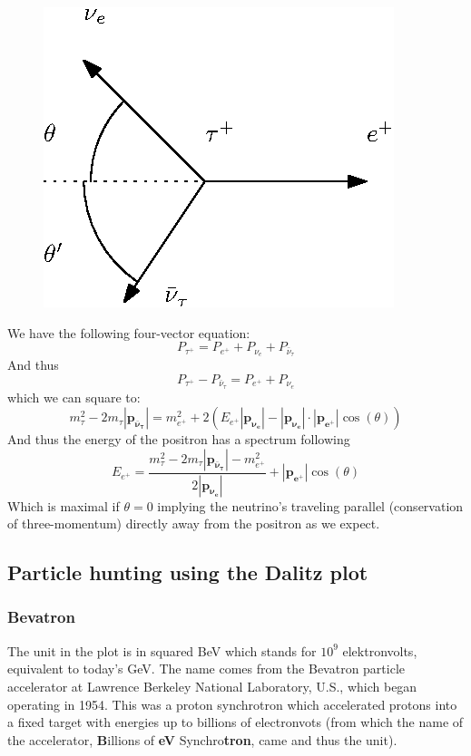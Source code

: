 \documentclass[10pt,a4paper,twoside]{article}
\begin{document}
\begin{figure}[H]
	\centering
	\includegraphics{interaction.eps}
\end{figure}
\noindent
We have the following four-vector equation:
\begin{equation}
	P_{\tau^+} = P_{e^+} + P_{\nu_e} + P_{\bar{\nu}_{\tau}}
\end{equation}
And thus
\begin{equation}
P_{\tau^+} - P_{\bar{\nu}_{\tau}}= P_{e^+} + P_{\nu_e}
\end{equation}
which we can square to:
\begin{equation}
	m_{\tau}^2 - 2m_{\tau}|\boldsymbol{p_{\bar{\nu}_{\tau}}}| = m_{e^+}^2+2\left(E_{e^+}|\boldsymbol{p_{\nu_{e}}}| - |\boldsymbol{p_{\nu_{e}}}|\cdot|\boldsymbol{p_{e^+}}|\cos(\theta)\right)
\end{equation}
And thus the energy of the positron has a spectrum following
\begin{equation}
	E_{e^+} = \frac{m_{\tau}^2 - 2m_{\tau}|\boldsymbol{p_{\bar{\nu}_{\tau}}}| - m_{e^+}^2}{2|\boldsymbol{p_{\nu_{e}}}|} + |\boldsymbol{p_{e^+}}|\cos(\theta)
\end{equation}
Which is maximal if $\theta = 0$ implying the neutrino's traveling parallel (conservation of three-momentum) directly away from the positron as we expect.
\subsection{Particle hunting using the Dalitz plot}
\subsubsection*{Bevatron}
The unit in the plot is in squared BeV which stands for $10^9$ elektronvolts, equivalent to today's GeV. The name comes from the Bevatron particle accelerator at Lawrence Berkeley National Laboratory, U.S., which began operating in 1954\cite{Lawrence}. This was a proton synchrotron which accelerated protons into a fixed target with energies up to billions of electronvots (from which the name of the accelerator, \textbf{B}illions of \textbf{eV} Synchro\textbf{tron}, came and thus the unit).
\end{document}
